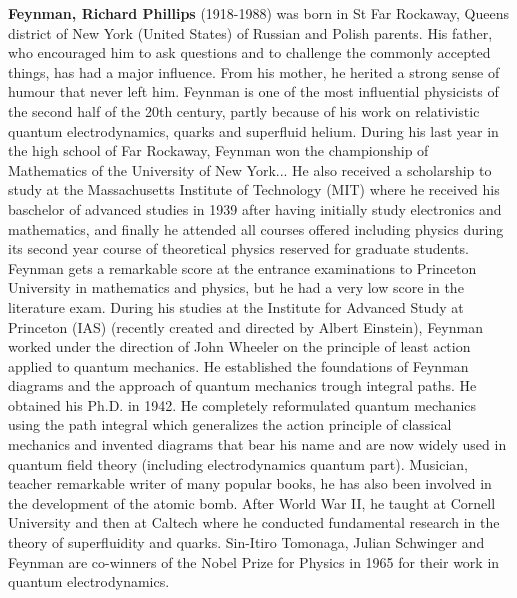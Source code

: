 \textbf{Feynman, Richard Phillips} (1918-1988) was  born in St Far Rockaway, Queens district of New York (United States) of Russian and Polish parents. His father, who encouraged him to ask questions and to challenge the commonly accepted things, has had a major influence. From his mother, he herited a strong sense of humour that never left him. Feynman is one of the most influential physicists of the second half of the 20th century, partly because of his work on relativistic quantum electrodynamics, quarks and superfluid helium. During his last year in the high school of Far Rockaway, Feynman won the championship of Mathematics of the University of New York... He also received a scholarship to study at the Massachusetts Institute of Technology (MIT) where he received his baschelor of advanced studies in 1939 after having initially study electronics and mathematics, and finally he attended all courses offered including physics during its second year course of theoretical physics reserved for graduate students. Feynman gets a remarkable score at the entrance examinations to Princeton University in mathematics and physics, but he had a very low score in the literature exam. During his studies at the Institute for Advanced Study at Princeton (IAS) (recently created and directed by Albert Einstein), Feynman worked under the direction of John Wheeler on the principle of least action applied to quantum mechanics. He established the foundations of Feynman diagrams and the approach of quantum mechanics trough integral paths. He obtained his Ph.D. in 1942. He completely reformulated quantum mechanics using the path integral which generalizes the action principle of classical mechanics and invented diagrams that bear his name and are now widely used in quantum field theory (including electrodynamics quantum part). Musician, teacher remarkable writer of many popular books, he has also been involved in the development of the atomic bomb. After World War II, he taught at Cornell University and then at Caltech where he conducted fundamental research in the theory of superfluidity and quarks. Sin-Itiro Tomonaga, Julian Schwinger and Feynman are co-winners of the Nobel Prize for Physics in 1965 for their work in quantum electrodynamics.

